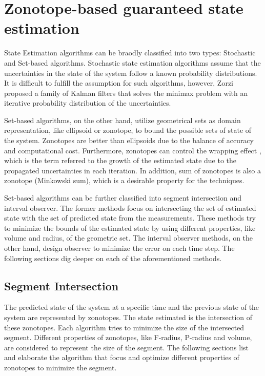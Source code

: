 \chapter{Zonotope-based guaranteed state estimation} \label{ch:state_estimation}
State Estimation algorithms can be braodly classified into two types: Stochastic and Set-based algorithms. Stochastic state estimation algorithms assume that the uncertainties in the state of the system follow a known probability distributions. It is difficult to fulfill the assumption for such algorithms, however, Zorzi \cite{Zorzi2017} proposed a family of Kalman filters that solves the minimax problem with an iterative probability distribution of the uncertainties.

Set-based algorithms, on the other hand, utilize geometrical sets as domain representation, like ellipsoid or zonotope, to bound the possible sets of state of the system. Zonotopes are better than ellipsoids due to the balance of accuracy and computational cost. Furthermore, zonotopes can control the wrapping effect \cite{Kuhn1998}, which is the term referred to the growth of the estimated state due to the propagated uncertainties in each iteration. In addition, sum of zonotopes is also a zonotope (Minkowski sum), which is a desirable property for the techniques.

Set-based algorithms can be further classified into segment intersection and interval observer. The former methods focus on intersecting the set of estimated state with the set of predicted state from the measurements. These methods try to minimize the bounds of the estimated state by using different properties, like volume and radius, of the geometric set. The interval observer methods, on the other hand, design observer to minimize the error on each time step. The following sections dig deeper on each of the aforementioned methods.

\section{Segment Intersection} 
The predicted state of the system at a specific time and the previous state of the system are represented by zonotopes. The state estimated is the intersection of these zonotopes. Each algorithm tries to minimize the size of the intersected segment. Different properties of zonotopes, like F-radius, P-radius and volume, are considered to represent the size of the segment. The following sections list and elaborate the algorithm that focus and optimize different properties of zonotopes to minimize the segment.


